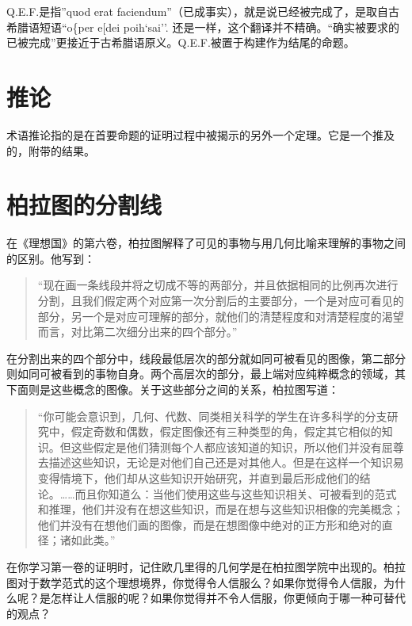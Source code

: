 \documentclass[
]{book}
\begin{document}
Q.E.F.是指''quod erat faciendum''（已成事实），就是说已经被完成了，是取自古希腊语短语``o\{per e{[}dei poih`sai''. 还是一样，这个翻译并不精确。``确实被要求的已被完成''更接近于古希腊语原义。Q.E.F.被置于构建作为结尾的命题。

\hypertarget{porism}{%
\section*{推论}\label{porism}}

术语推论指的是在首要命题的证明过程中被揭示的另外一个定理。它是一个推及的，附带的结果。

\hypertarget{plato}{%
\section*{柏拉图的分割线}\label{plato}}

在《理想国》的第六卷，柏拉图解释了可见的事物与用几何比喻来理解的事物之间的区别。他写到：

\begin{quote}
``现在画一条线段并将之切成不等的两部分，并且依据相同的比例再次进行分割，且我们假定两个对应第一次分割后的主要部分，一个是对应可看见的部分，另一个是对应可理解的部分，就他们的清楚程度和对清楚程度的渴望而言，对比第二次细分出来的四个部分。''
\end{quote}

在分割出来的四个部分中，线段最低层次的部分就如同可被看见的图像，第二部分则如同可被看到的事物自身。两个高层次的部分，最上端对应纯粹概念的领域，其下面则是这些概念的图像。关于这些部分之间的关系，柏拉图写道：

\begin{quote}
``你可能会意识到，几何、代数、同类相关科学的学生在许多科学的分支研究中，假定奇数和偶数，假定图像还有三种类型的角，假定其它相似的知识。但这些假定是他们猜测每个人都应该知道的知识，所以他们并没有屈尊去描述这些知识，无论是对他们自己还是对其他人。但是在这样一个知识易变得情境下，他们却从这些知识开始研究，并直到最后形成他们的结论。\ldots\ldots 而且你知道么：当他们使用这些与这些知识相关、可被看到的范式和推理，他们并没有在想这些知识，而是在想与这些知识相像的完美概念；他们并没有在想他们画的图像，而是在想图像中绝对的正方形和绝对的直径；诸如此类。''
\end{quote}

在你学习第一卷的证明时，记住欧几里得的几何学是在柏拉图学院中出现的。柏拉图对于数学范式的这个理想境界，你觉得令人信服么？如果你觉得令人信服，为什么呢？是怎样让人信服的呢？如果你觉得并不令人信服，你更倾向于哪一种可替代的观点？
\end{document}
